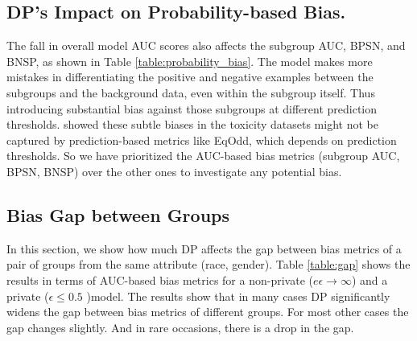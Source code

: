 \documentclass[11pt]{article} %
\begin{document}
\subsection{DP's Impact on Probability-based Bias.}

The fall in overall model AUC scores also affects the subgroup AUC, BPSN, and BNSP, as shown in Table  \ref{table:probability_bias}. The model makes more mistakes in differentiating the positive and negative examples between the subgroups and the background data, even within the subgroup itself. Thus introducing substantial bias against those subgroups at different prediction thresholds. 
\cite{borkan2019nuanced} showed these subtle biases in the toxicity datasets might not be captured by prediction-based metrics like EqOdd, which depends on prediction thresholds. So we have prioritized the AUC-based bias metrics (subgroup AUC, BPSN, BNSP) over the other ones to investigate any potential bias.

\subsection{Bias Gap between Groups}
In this section, we show how much DP affects the gap between bias metrics of a pair of groups from the same attribute (race, gender). Table \ref{table:gap} shows the results in terms of AUC-based bias metrics for a non-private ($e\epsilon \to \infty$) and a private ($\epsilon \le 0.5$ )model. The results show that in many cases DP significantly widens the gap between bias metrics of different groups. For most other cases the gap changes slightly.  And in rare occasions, there is a drop in the gap.
\end{document}
